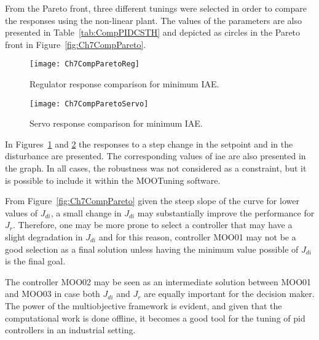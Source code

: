 From the Pareto front, three different tunings were selected in order to compare the responses using the non-linear plant. The values of the parameters are also presented in Table~\ref{tab:CompPIDCSTH} and depicted as circles in the Pareto front in Figure~\ref{fig:Ch7CompPareto}.
%
\begin{figure}[tb]
	\centering
	\texttt{[image: Ch7CompParetoReg]}
	\caption{Regulator response comparison for minimum IAE.}
	\label{fig:Ch7CompParetoReg}
\end{figure}
%
\begin{figure}[tb]
	\centering
	\texttt{[image: Ch7CompParetoServo]}
	\caption{Servo response comparison for minimum IAE.}
	\label{fig:Ch7CompParetoServo}
\end{figure}

In Figures~\ref{fig:Ch7CompParetoReg} and \ref{fig:Ch7CompParetoServo} the responses to a step change in the setpoint and in the disturbance are presented. The corresponding values of \gls{iae} are also presented in the graph. In all cases, the robustness was not considered as a constraint, but it is possible to include it within the MOOTuning software.

From Figure~\ref{fig:Ch7CompPareto} given the steep slope of the curve for lower values of $J_{di}$, a small change in $J_{di}$ may substantially improve the performance for $J_r$. Therefore, one may be more prone to select a controller that may have a slight degradation in $J_{di}$ and for this reason, controller MOO01 may not be a good selection as a final solution unless having the minimum value possible of $J_{di}$ is the final goal.

The controller MOO02 may be seen as an intermediate solution between MOO01 and MOO03 in case both $J_{di}$ and $J_r$ are equally important for the decision maker. The power of the multiobjective framework is evident, and given that the computational work is done offline, it becomes a good tool for the tuning of \gls{pid} controllers in an industrial setting.

